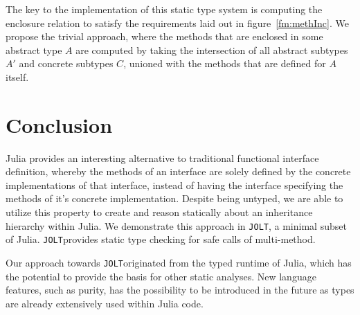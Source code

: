 \documentclass[preprint]{sigplanconf}
\newcommand{\xt}[1]{\texttt{#1}}
\newcommand{\jolt}{\xt{JOLT}}
\begin{document}
The key to the implementation of this static type system is computing the 
enclosure relation to satisfy the requirements laid out in figure~\ref{fm:methInc}.
We propose the trivial approach, where the methods that are enclosed in some
abstract type $A$ are computed by taking the intersection of all abstract subtypes
$A'$ and concrete subtypes $C$, unioned with the methods that are defined for $A$
itself. 

\section{Conclusion}

Julia provides an interesting alternative to traditional functional interface 
definition, whereby the methods of an interface are solely defined by 
the concrete implementations of that interface, instead of having the interface specifying
the methods of it's concrete implementation. Despite being
untyped, we are able to utilize this property to create and reason statically about an inheritance
hierarchy within Julia. We demonstrate this approach in \jolt, a minimal subset
of Julia. \jolt provides static type checking for safe calls of multi-method.

Our approach towards \jolt originated from the typed runtime of Julia, which has the potential to
provide the basis for other static analyses. New language features, such as purity, has the possibility
to be introduced in the future as types are already extensively used within Julia code.



\end{document}
